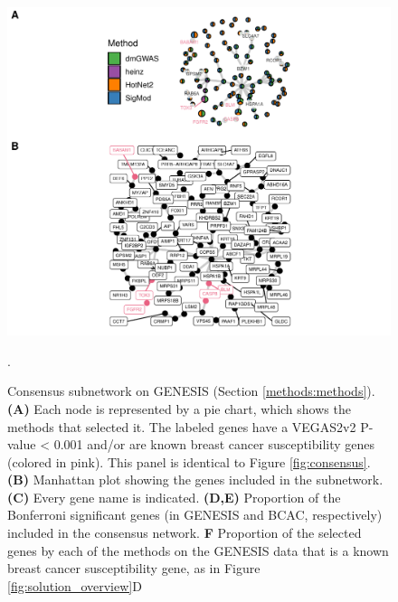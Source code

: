 \documentclass[twocolumn, 10pt]{article}
\begin{document}
\begin{figure}[htbp]
\centering
\includegraphics[width=.9\linewidth]{./figures/sfigure_4.pdf}
\caption{\label{sfig:consensus_names}
Consensus subnetwork on GENESIS (Section \ref{methods:methods}). \textbf{(A)} Each node is represented by a pie chart, which shows the methods that selected it. The labeled genes have a VEGAS2v2 P-value < 0.001 and/or are known breast cancer susceptibility genes (colored in pink). This panel is identical to Figure \ref{fig:consensus}. \textbf{(B)} Manhattan plot showing the genes included in the subnetwork. \textbf{(C)} Every gene name is indicated. \textbf{(D,E)} Proportion of the Bonferroni significant genes (in GENESIS and BCAC, respectively) included in the consensus network. \textbf{F} Proportion of the selected genes by each of the methods on the GENESIS data that is a known breast cancer susceptibility gene, as in Figure \ref{fig:solution_overview}D}.
\end{figure}
\end{document}
